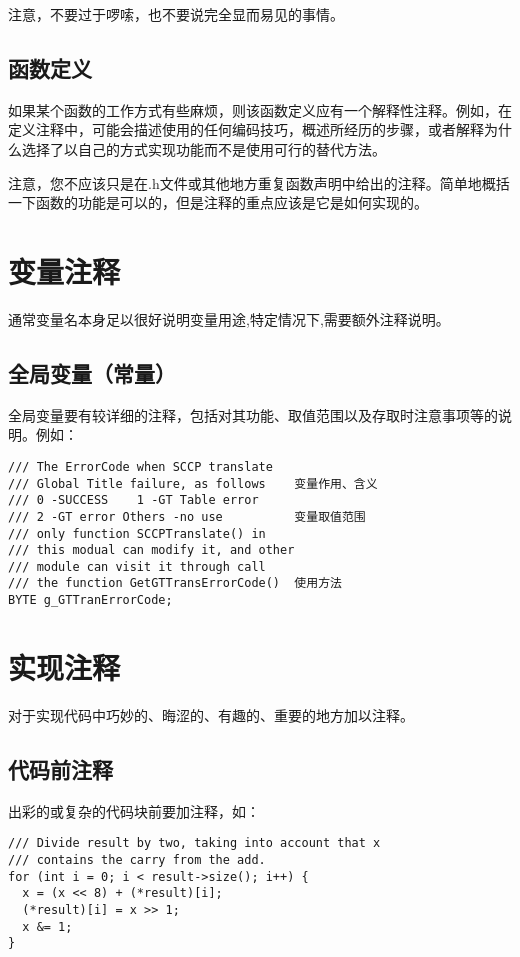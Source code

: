 注意，不要过于啰嗦，也不要说完全显而易见的事情。


\subsection{函数定义}
如果某个函数的工作方式有些麻烦，则该函数定义应有一个解释性注释。例如，在定义注释中，可能会描述使用的任何编码技巧，概述所经历的步骤，或者解释为什么选择了以自己的方式实现功能而不是使用可行的替代方法。

注意，您不应该只是在.h文件或其他地方重复函数声明中给出的注释。简单地概括一下函数的功能是可以的，但是注释的重点应该是它是如何实现的。

\section{变量注释}
通常变量名本身足以很好说明变量用途,特定情况下,需要额外注释说明。


\subsection{全局变量（常量）}
全局变量要有较详细的注释，包括对其功能、取值范围以及存取时注意事项等的说明。例如：
\begin{verbatim}
/// The ErrorCode when SCCP translate
/// Global Title failure, as follows    变量作用、含义
/// 0 -SUCCESS    1 -GT Table error
/// 2 -GT error Others -no use          变量取值范围
/// only function SCCPTranslate() in
/// this modual can modify it, and other
/// module can visit it through call
/// the function GetGTTransErrorCode()  使用方法
BYTE g_GTTranErrorCode;
\end{verbatim}


\section{实现注释}
对于实现代码中巧妙的、晦涩的、有趣的、重要的地方加以注释。


\subsection{代码前注释}
出彩的或复杂的代码块前要加注释，如：
\begin{verbatim}
/// Divide result by two, taking into account that x
/// contains the carry from the add.
for (int i = 0; i < result->size(); i++) {
  x = (x << 8) + (*result)[i];
  (*result)[i] = x >> 1;
  x &= 1;
}
\end{verbatim}



